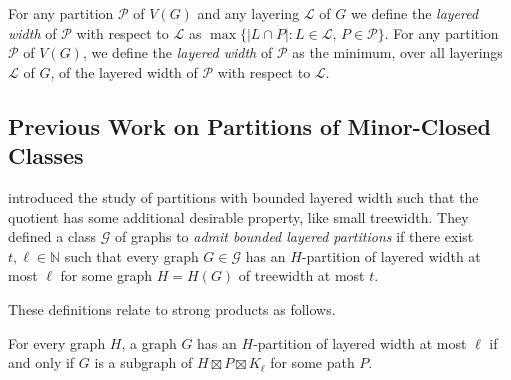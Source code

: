 \documentclass{patmorin}
\newcommand{\notex}[2]{}
\begin{document}
For any partition $\mathcal{P}$ of $V(G)$ and any layering $\mathcal{L}$ of $G$ we define the \emph{layered width} of $\mathcal{P}$ with respect to $\mathcal{L}$ as $\max\{|L\cap P|: L\in\mathcal{L},\, P\in\mathcal{P}\}$.  For any partition $\mathcal{P}$ of $V(G)$, we define the \emph{layered width} of $\mathcal{P}$ as the minimum, over all layerings $\mathcal{L}$ of $G$, of the layered width of $\mathcal{P}$ with respect to $\mathcal{L}$.





\subsection{Previous Work on Partitions of Minor-Closed Classes}

\citet{dujmovic.joret.ea:planar} introduced the study of partitions with bounded layered width such that the quotient has some additional desirable property, like small treewidth. 
They defined a class $\mathcal{G}$ of graphs to \emph{admit bounded layered partitions} if there exist $t,\ell\in\mathbb{N}$ such that every graph $G\in \mathcal{G}$ has an $H$-partition of layered width at most $\ell$ for some graph $H=H(G)$ of treewidth at most $t$.

These definitions relate to strong products as follows. 

\begin{lem} 
\label{PartitionProduct}
For every graph $H$, a graph $G$ has an $H$-partition of layered width at most $\ell$ if and only if $G$ is a subgraph of 
$H \boxtimes P \boxtimes K_\ell$ for some path $P$.
\end{lem}
\end{document}
